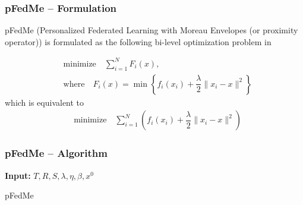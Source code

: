 
\begin{frame}
\frametitle{pFedMe -- Formulation}

pFedMe (Personalized Federated Learning with Moreau Envelopes (or proximity operator)) is formulated as the following bi-level optimization problem in \cite{t2020pfedme}

\begin{align*}
    & \text{minimize} \quad \sum\limits_{i=1}^N F_i(x), \\
    & \text{where} \quad F_i(x) = \min \left\{ f_i(x_i) + \dfrac{\lambda}{2} \lVert x_i - x \rVert^2 \right\}
\end{align*}
which is equivalent to
\begin{align*}
    & \text{minimize} \quad \sum\limits_{i=1}^N \left( f_i(x_i) + \dfrac{\lambda}{2} \lVert x_i - x \rVert^2 \right)
\end{align*}


\end{frame}


\begin{frame}
\frametitle{pFedMe -- Algorithm}

\begin{algorithm}[H]
\SetAlgoNoLine
\DontPrintSemicolon
{\bfseries Input:} $T,R,S,\lambda,\eta,\beta,x^0$\;
\caption{pFedMe\cite{t2020pfedme}}
\end{algorithm}

\end{frame}


